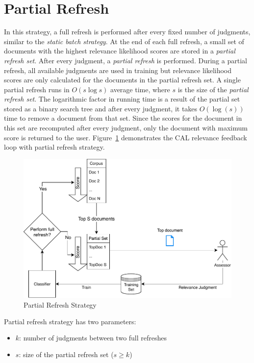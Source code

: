 \section{Partial Refresh}
\label{sec:partial}

In this strategy, a full refresh is performed after every fixed number of
judgments, similar to the \textit{static batch strategy}. At the end of each
full refresh, a small set of documents with the highest relevance likelihood
scores are stored in a \textit{partial refresh set}. After every judgment, a
\textit{partial refresh} is performed. During a partial refresh, all available
judgments are used in training but relevance likelihood scores are only
calculated for the documents in the partial refresh set. A single partial
refresh runs in $O(s\log{s})$ average time, where $s$ is the size of the
\textit{partial refresh set}. The logarithmic factor in running time
is a result of the partial set stored as a binary search tree and after every
judgment, it takes $O(\log(s))$ time to remove a document from that set. Since
the scores for the document in this set are recomputed after every
judgment, only the document with maximum score is returned to the user.
Figure~\ref{fig:partial_flow} demonstrates the CAL relevance feedback loop with
partial refresh strategy.

\begin{figure}
 \centering 
 \includegraphics[width=1.0\textwidth]{figures/partial.pdf}
 \caption{Partial Refresh Strategy}
 \label{fig:partial_flow}
\end{figure}


Partial refresh strategy has two parameters:
\begin{itemize}
    \item $k$: number of judgments between two full refreshes
    \item $s$: size of the partial refresh set ($s \ge k$)
\end{itemize}

